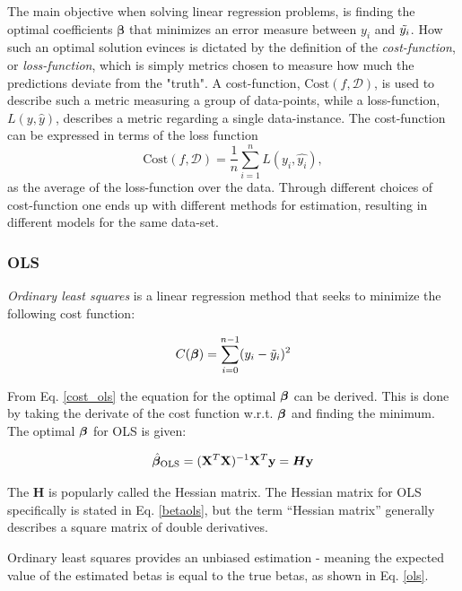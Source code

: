 The main objective when solving linear regression problems, is finding the optimal coefficients $\boldsymbol{\beta}$ that minimizes an error measure between $y_i$ and $\Tilde{y_i}$. 
How such an optimal solution evinces is dictated by the definition of the \textit{cost-function},  or \textit{loss-function}, which is simply metrics chosen to measure how much the predictions deviate from the "truth". 
A cost-function, $\text{Cost}(f,\mathcal{D} )$, is used to describe such a metric measuring a group of data-points, while a loss-function, $L(y, \hat{y})$, describes a metric regarding a single data-instance. 
The cost-function can be expressed in terms of the loss function
\begin{equation}
\text{Cost}(f,\mathcal{D}) = \frac{1}{n}\sum_{i=1}^n L(y_i, \hat{y_i}),
\end{equation}
as the average of the loss-function over the data. 
Through different choices of cost-function one ends up with different methods for estimation, resulting in different models for the same data-set. 


\subsubsection{OLS}

\textit{Ordinary least squares} is a linear regression method that seeks to minimize the following cost function:

\begin{equation}\label{cost_ols}
    C(\boldsymbol{\beta}) = \sum_{i=0}^{n-1}(y_i-\Tilde{y}_i)^2
\end{equation}

From Eq. \ref{cost_ols} the equation for the optimal $\boldsymbol{\beta}$ can be derived. This is done by taking the derivate of the cost function w.r.t. $\boldsymbol{\beta}$ and finding the minimum. The optimal $\boldsymbol{\beta}$ for OLS is given: 

\begin{equation}\label{betaols}
    \hat{\boldsymbol{\beta}}_{\text{OLS}} = (\mathbf{X}^T\mathbf{X})^{-1}\mathbf{X}^T\mathbf{y} = \boldsymbol{H}\mathbf{y}
\end{equation}

The $\boldsymbol{H}$ is popularly called the Hessian matrix. The Hessian matrix for OLS specifically is stated in Eq. \ref{betaols}, but the term ``Hessian matrix'' generally describes a square matrix of double derivatives.


Ordinary least squares provides an unbiased estimation - meaning the expected value of the estimated betas is equal to the true betas, as shown in Eq. \ref{ols}.  

